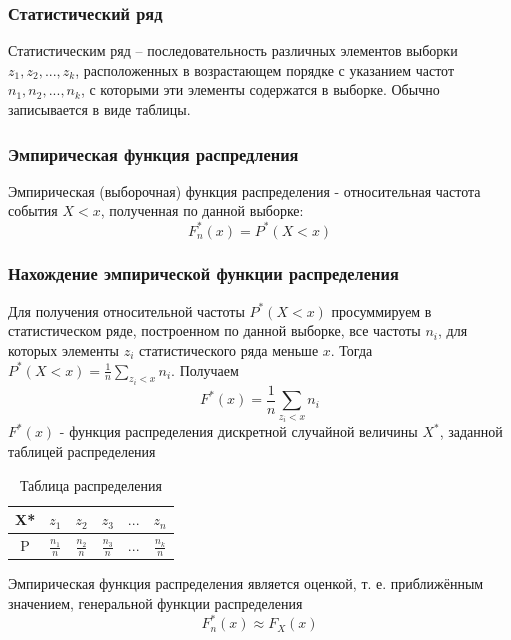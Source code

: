 \documentclass[12pt,a4paper]{article}
\begin{document}
			\subsubsection{Статистический ряд}
				Статистическим ряд – последовательность различных элементов выборки
				$z_1, z_2, ... , z_k$, расположенных в возрастающем порядке с указанием частот
				$n_1, n_2, ... , n_k$, с которыми эти элементы содержатся в выборке. Обычно записывается в виде таблицы.
			\subsubsection{Эмпирическая функция распредления}
				Эмпирическая (выборочная) функция распределения  - относительная частота события $X < x$, полученная по данной выборке:
				\begin{equation}
					F^*_n(x)=P^*(X<x)
				\end{equation}
			
			\subsubsection{Нахождение эмпирической функции распределения}
				Для получения относительной частоты $P^*(X<x)$ просуммируем в статистическом ряде, построенном по данной выборке, все частоты
				$n_i$, для которых элементы $z_i$ статистического ряда меньше $x$. Тогда $P^*(X<x)=\frac{1}{n}\sum_{z_i<x}^{ } n_i$. Получаем
				\begin{equation}
					F^*(x)=\frac{1}{n} \sum_{z_i<x}^{ } n_i
				\end{equation}
				$F^*(x)$ - функция распределения дискретной случайной величины $X^*$, заданной таблицей распределения
				\begin{table}[h!]
					\label{distr_table}
					\begin{center}
						\begin{tabular}{|c|c|c|c|c|c|}
							\hline
							X* & $z_1$ & $z_2$ & $z_3$ & $...$ & $z_n$ \\ \hline
							P & $\frac{n_1}{n}$ & $\frac{n_2}{n}$ & $\frac{n_3}{n}$ & $...$ & $\frac{n_k}{n}$ \\ \hline
						\end{tabular}
					\end{center}
					\caption{Таблица распределения}
				\end{table}

				Эмпирическая функция распределения является оценкой, т. е. приближённым значением, генеральной функции распределения
				\begin{equation}
					F^*_n(x) \approx F_X(x)
				\end{equation}
			
\end{document}
